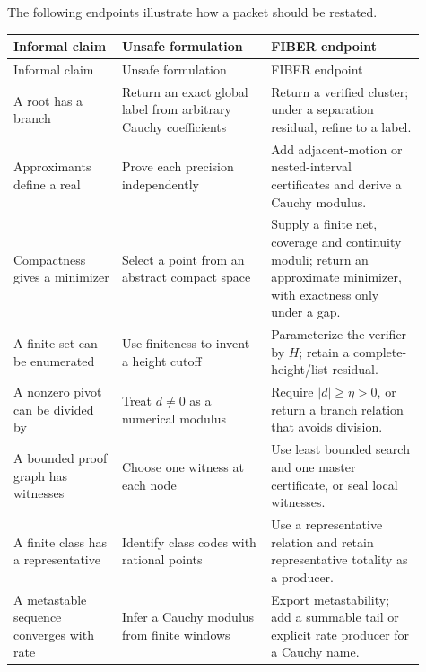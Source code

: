 The following endpoints illustrate how a packet should be restated.

\begin{longtable}{p{0.24\linewidth}p{0.33\linewidth}p{0.34\linewidth}}
\toprule
Informal claim & Unsafe formulation & FIBER endpoint\\
\midrule
\endfirsthead
\toprule
Informal claim & Unsafe formulation & FIBER endpoint\\
\midrule
\endhead
A root has a branch & Return an exact global label from arbitrary Cauchy coefficients & Return a verified cluster; under a separation residual, refine to a label.\\
Approximants define a real & Prove each precision independently & Add adjacent-motion or nested-interval certificates and derive a Cauchy modulus.\\
Compactness gives a minimizer & Select a point from an abstract compact space & Supply a finite net, coverage and continuity moduli; return an approximate minimizer, with exactness only under a gap.\\
A finite set can be enumerated & Use finiteness to invent a height cutoff & Parameterize the verifier by \(H\); retain a complete-height/list residual.\\
A nonzero pivot can be divided by & Treat \(d\ne0\) as a numerical modulus & Require \(|d|\ge\eta>0\), or return a branch relation that avoids division.\\
A bounded proof graph has witnesses & Choose one witness at each node & Use least bounded search and one master certificate, or seal local witnesses.\\
A finite class has a representative & Identify class codes with rational points & Use a representative relation and retain representative totality as a producer.\\
A metastable sequence converges with rate & Infer a Cauchy modulus from finite windows & Export metastability; add a summable tail or explicit rate producer for a Cauchy name.\\
\bottomrule
\end{longtable}
